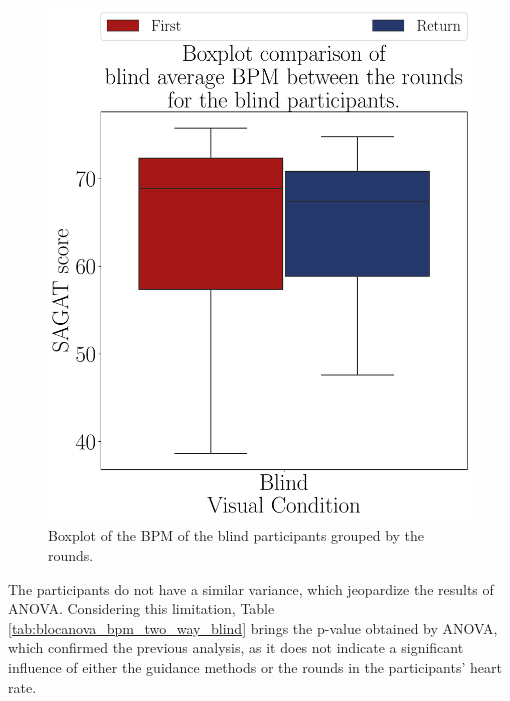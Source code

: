 \begin{figure}[!htb]
    \centering
    \includegraphics[width = 0.75\linewidth]{Resultados/ECG/Figuras/pdf/boxplot_ecg_bpm_blind_rounds.pdf}
    \caption{Boxplot of the BPM of the blind participants grouped by the rounds.}
    \label{fig:boxplot_ecg_bpm_blind_rounds}
\end{figure}

The participants do not have a similar variance, which jeopardize the results of ANOVA. Considering this limitation, Table \ref{tab:blocanova_bpm_two_way_blind} brings the p-value obtained by ANOVA, which confirmed the previous analysis, as it does not indicate a significant influence of either the guidance methods or the rounds in the participants' heart rate. 
%
%


